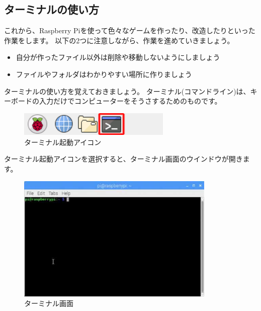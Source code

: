 \subsection{ターミナルの使い方}
これから、Raspberry Piを使って色々なゲームを作ったり、改造したりといった作業をします。
以下の2つに注意しながら、作業を進めていきましょう。

\begin{itemize}
  \item 自分が作ったファイル以外は削除や移動しないようにしましょう
  \item ファイルやフォルダはわかりやすい場所に作りましょう
\end{itemize}

ターミナルの使い方を覚えておきましょう。
ターミナル(コマンドライン)は、キーボードの入力だけでコンピューターをそうさするためのものです。

\begin{figure}[H]
  \begin{center}
    \includegraphics[keepaspectratio,width=7.303cm,height=1.15cm]{images/chap02/text02-img003.png}
    \caption{ターミナル起動アイコン}
  \end{center}
  \label{fig:terminal_icon}
\end{figure}

ターミナル起動アイコンを選択すると、ターミナル画面のウインドウが開きます。

\begin{figure}[H]
  \begin{center}
    \includegraphics[keepaspectratio,width=9.472cm,height=6.061cm]{images/chap02/text02-img004.png}
    \caption{ターミナル画面}
  \end{center}
  \label{fig:terminal_display}
\end{figure}

